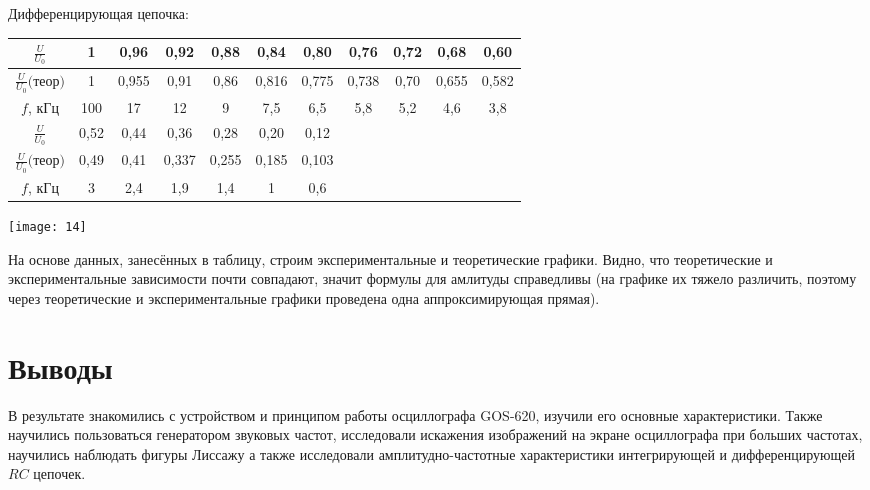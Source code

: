 \documentclass[a4paper, 12pt]{article} %
\begin{document}
Дифференцирующая цепочка:
\begin{center}
\begin{tabular}{|c|c|c|c|c|c|c|c|c|c|c|}
 \hline 
 $\frac{U}{U_0}$ & 1 & 0,96 & 0,92 & 0,88 & 0,84 & 0,80 & 0,76 & 0,72 & 0,68 & 0,60\\ 
  \hline 
 $\frac{U}{U_0} \text{(теор)}$ & 1 & 0,955 & 0,91 & 0,86 & 0,816 & 0,775 & 0,738 & 0,70 & 0,655 & 0,582\\
 \hline 
 $f$, кГц & 100 & 17 & 12 & 9 & 7,5 & 6,5 & 5,8 & 5,2 & 4,6 & 3,8 \\ 
 \hline 
 $\frac{U}{U_0}$  & 0,52 & 0,44 & 0,36 & 0,28 & 0,20 & 0,12 &&&&  \\ 
 \hline 
 $\frac{U}{U_0} \text{(теор)}$  & 0,49 & 0,41 & 0,337 & 0,255 & 0,185 & 0,103 &&&&  \\ 
 \hline 
 $f$, кГц & 3 & 2,4 & 1,9 & 1,4 & 1 & 0,6 &&&& \\ 
 \hline 
 \end{tabular}
 \end{center}
 
\begin{center}
	\texttt{[image: 14]}
\end{center}
 
 На основе данных, занесённых в таблицу, строим экспериментальные и теоретические графики. Видно, что теоретические и экспериментальные зависимости почти совпадают, значит формулы для амлитуды справедливы (на графике их тяжело различить, поэтому через теоретические и экспериментальные графики проведена одна аппроксимирующая прямая).


\section{Выводы}

В результате знакомились с устройством и принципом работы осциллографа GOS-620, изучили его основные характеристики. Также научились пользоваться генератором звуковых частот, исследовали искажения изображений на экране осциллографа при больших частотах, научились наблюдать фигуры Лиссажу а также исследовали амплитудно-частотные характеристики интегрирующей и дифференцирующей $RC$ цепочек.
\end{document}
